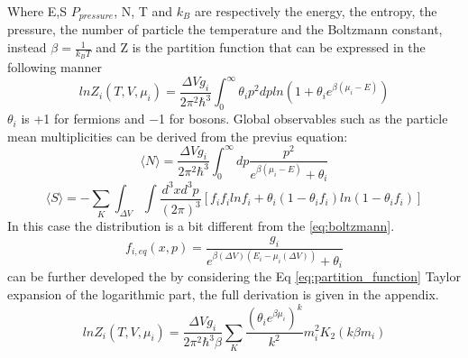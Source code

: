 \documentclass[12pt,a4paper]{book}
\begin{document}
	Where E,S $P_{pressure}$, N, T and $k_B$ are respectively the energy, the entropy, the pressure, the number of particle the temperature and the Boltzmann constant, instead $\beta=\frac{1}{k_BT}$ and Z is the partition function that can be expressed in the following manner
	\begin{equation}
		ln Z_i(T,V,\mu_i)= \frac{\Delta V g_i}{2\pi^2\hbar^3} \int_{0}^{\infty} \theta_i p^2 dp ln(1+\theta_i e^{\beta(\mu_i-E)})
		\label{eq:partition_function}
	\end{equation}
	$\theta_i$ is +1 for fermions and −1 for bosons. Global observables such as the
	particle mean multiplicities can be derived from the previus equation:
	\begin{equation}
		\langle N \rangle = \frac{\Delta V g_i}{2\pi^2\hbar^3} \int_{0}^{\infty} dp \frac{p^2}{e^{\beta(\mu_i-E)}+\theta_i} 
		\label{eq:particle_number}
	\end{equation}
	\begin{equation}
	\langle S \rangle= -\sum_{K} \int_{\Delta V} \int \frac{d^3x d^3p}{(2\pi)^3} \left[f_i f_i ln f_i + \theta_i (1-\theta_if_i)ln(1-\theta_if_i) \right]
		\label{eq:entropy}
	\end{equation}
	In this case the distribution is a bit different from the \ref{eq:boltzmann}.
	\begin{equation}
		f_{i,eq}(x,p)=\frac{g_i}{e^{\beta(\Delta V)(E_i-\mu_i(\Delta V))} +\theta_i} 
		\label{eq:boltmann2}
	\end{equation}
	can be further developed the by considering the Eq \ref{eq:partition_function} Taylor expansion of the logarithmic part, the full derivation is given in the appendix.
	\begin{equation}
		ln Z_i(T,V,\mu_i)= \frac{\Delta V g_i}{2\pi^2\hbar^3\beta} \sum_{K} \frac{(\theta_i e^{\beta \mu_i})^k}{k^2} m_i^2K_2(k\beta m_i)
		\label{eq:partition_function2}
	\end{equation}
	 
\end{document}

